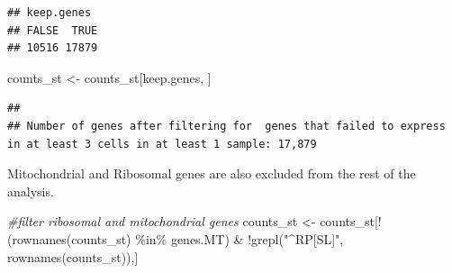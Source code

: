 \documentclass[
]{book}
\newenvironment{Shaded}{\begin{snugshade}}{\end{snugshade}}
\newcommand{\CommentTok}[1]{\textcolor[rgb]{0.56,0.35,0.01}{\textit{#1}}}
\newcommand{\ControlFlowTok}[1]{\textcolor[rgb]{0.13,0.29,0.53}{\textbf{#1}}}
\newcommand{\DecValTok}[1]{\textcolor[rgb]{0.00,0.00,0.81}{#1}}
\newcommand{\FunctionTok}[1]{\textcolor[rgb]{0.00,0.00,0.00}{#1}}
\newcommand{\NormalTok}[1]{#1}
\newcommand{\OtherTok}[1]{\textcolor[rgb]{0.56,0.35,0.01}{#1}}
\newcommand{\SpecialCharTok}[1]{\textcolor[rgb]{0.00,0.00,0.00}{#1}}
\newcommand{\StringTok}[1]{\textcolor[rgb]{0.31,0.60,0.02}{#1}}
\begin{document}
\begin{Shaded}
\end{Shaded}

\begin{verbatim}
## keep.genes
## FALSE  TRUE 
## 10516 17879
\end{verbatim}

\begin{Shaded}
\begin{Highlighting}[]
\NormalTok{counts\_st }\OtherTok{\textless{}{-}}\NormalTok{ counts\_st[keep.genes, ]}
\end{Highlighting}
\end{Shaded}

\begin{verbatim}
## 
## Number of genes after filtering for  genes that failed to express in at least 3 cells in at least 1 sample: 17,879
\end{verbatim}

Mitochondrial and Ribosomal genes are also excluded from the rest of the analysis.

\begin{Shaded}
\begin{Highlighting}[]
\CommentTok{\#filter ribosomal and mitochondrial genes}
\NormalTok{counts\_st }\OtherTok{\textless{}{-}}
\NormalTok{  counts\_st[}\SpecialCharTok{!}\NormalTok{(}\FunctionTok{rownames}\NormalTok{(counts\_st) }\SpecialCharTok{\%in\%}\NormalTok{ genes.MT) }\SpecialCharTok{\&}
       \SpecialCharTok{!}\FunctionTok{grepl}\NormalTok{(}\StringTok{"\^{}RP[SL]"}\NormalTok{, }\FunctionTok{rownames}\NormalTok{(counts\_st)),]}
\end{Highlighting}
\end{Shaded}
\end{document}
